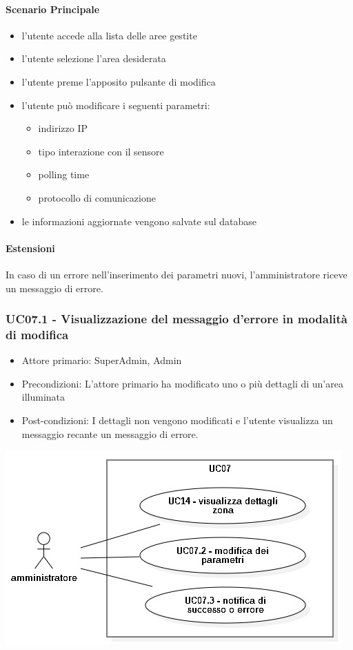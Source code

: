 \documentclass[12pt]{article}
\begin{document}
\paragraph{Scenario Principale}
\begin{itemize}
	\item l'utente accede alla lista delle aree gestite
	\item l'utente selezione l'area desiderata
	\item l'utente preme l'apposito pulsante di modifica
	\item l'utente può modificare i seguenti parametri:
		\begin{itemize}
			\item indirizzo IP
			\item tipo interazione con il sensore
			\item polling time
			\item protocollo di comunicazione
		\end{itemize}
	\item le informazioni aggiornate vengono salvate sul database
\end{itemize}
\paragraph{Estensioni} In caso di un errore nell'inserimento dei parametri nuovi, l'amministratore riceve un messaggio di errore.

\subsubsection{UC07.1 - Visualizzazione del messaggio d'errore in modalità di modifica}
\begin{itemize}
	\item Attore primario: SuperAdmin, Admin
	\item Precondizioni: L'attore primario ha modificato uno o più dettagli di un'area illuminata
	\item Post-condizioni: I dettagli non vengono modificati e l'utente visualizza un messaggio recante un messaggio di errore.
\end{itemize}

\includegraphics[scale=0.5]{UC07.png}
\end{document}
